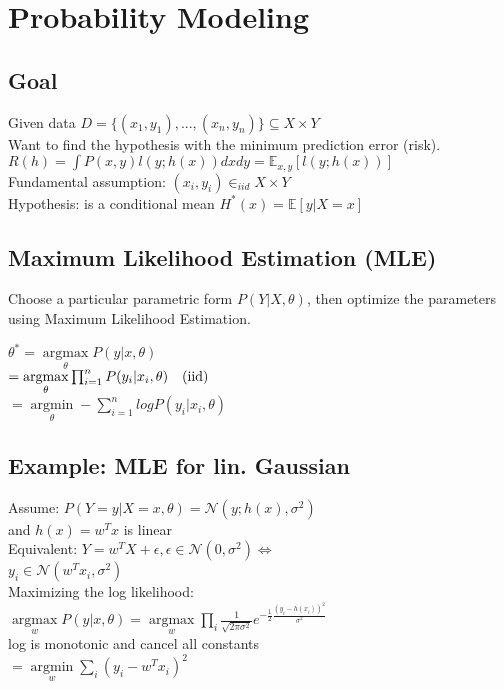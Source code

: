 \section*{Probability Modeling}
\subsection*{Goal}
Given data $D=\{(x_1,y_1), ..., (x_n,y_n)\} \subseteq X \times Y$\\
Want to find the hypothesis with the minimum prediction error (risk). $R(h) = \int P(x,y)l(y;h(x)) dxdy = \mathbb{E}_{x,y}[l(y;h(x))]$\\
Fundamental assumption: $(x_i,y_i) \in_{iid} X \times Y$\\
Hypothesis: is a conditional mean $H^*(x) = \mathbb{E}[y|X=x]$
\subsection*{Maximum Likelihood Estimation (MLE)}
Choose a particular parametric form $P(Y|X,\theta)$, then optimize the parameters using Maximum Likelihood Estimation.

$\theta^* = \underset{\theta}{\operatorname{argmax}} P(y|x,\theta) $\\
$= \underset{\theta}{\operatorname{argmax}} \prod_{i=1}^n P(y_i|x_i, \theta) \text{\quad (iid)}$\\
$= \underset{\theta}{\operatorname{argmin}} - \sum_{i=1}^n log P(y_i|x_i,\theta)$\\

\subsection*{Example: MLE for lin. Gaussian}
Assume: $P(Y=y|X=x, \theta) = \mathcal{N}(y;h(x),\sigma^2)$\\
and $h(x) = w^T x$ is linear\\
Equivalent: $Y=w^T X + \epsilon, \epsilon \in \mathcal{N}(0, \sigma^2) \Leftrightarrow$\\
$y_i \in \mathcal{N} (w^T x_i, \sigma^2)$\\
Maximizing the log likelihood:\\
$\underset{w}{\operatorname{argmax}} P(y|x,\theta) = \underset{w}{\operatorname{argmax}} \prod \limits_i \frac{1}{\sqrt{2\pi\sigma^2}} e^{-\frac{1}{2} \frac{(y_i-h(x_i))^2}{\sigma^2}}$\\
log is monotonic and cancel all constants\\
$= \underset{w}{\operatorname{argmin}}  \sum_i (y_i-w^Tx_i)^2$

